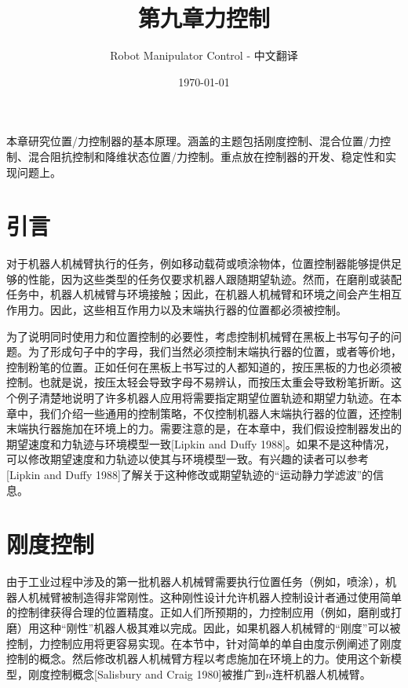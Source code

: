 \documentclass[12pt,a4paper]{ctexart}
\title{第九章\quad 力控制}
\author{Robot Manipulator Control - 中文翻译}
\date{\today}
\begin{document}
\maketitle

本章研究位置/力控制器的基本原理。涵盖的主题包括刚度控制、混合位置/力控制、混合阻抗控制和降维状态位置/力控制。重点放在控制器的开发、稳定性和实现问题上。

\section{引言}\label{sec:9.1}

对于机器人机械臂执行的任务，例如移动载荷或喷涂物体，位置控制器能够提供足够的性能，因为这些类型的任务仅要求机器人跟随期望轨迹。然而，在磨削或装配任务中，机器人机械臂与环境接触；因此，在机器人机械臂和环境之间会产生相互作用力。因此，这些相互作用力以及末端执行器的位置都必须被控制。

为了说明同时使用力和位置控制的必要性，考虑控制机械臂在黑板上书写句子的问题。为了形成句子中的字母，我们当然必须控制末端执行器的位置，或者等价地，控制粉笔的位置。正如任何在黑板上书写过的人都知道的，按压黑板的力也必须被控制。也就是说，按压太轻会导致字母不易辨认，而按压太重会导致粉笔折断。这个例子清楚地说明了许多机器人应用将需要指定期望位置轨迹和期望力轨迹。在本章中，我们介绍一些通用的控制策略，不仅控制机器人末端执行器的位置，还控制末端执行器施加在环境上的力。需要注意的是，在本章中，我们假设控制器发出的期望速度和力轨迹与环境模型一致[Lipkin and Duffy 1988]。如果不是这种情况，可以修改期望速度和力轨迹以使其与环境模型一致。有兴趣的读者可以参考[Lipkin and Duffy 1988]了解关于这种修改或期望轨迹的``运动静力学滤波''的信息。

\section{刚度控制}\label{sec:9.2}

由于工业过程中涉及的第一批机器人机械臂需要执行位置任务（例如，喷涂），机器人机械臂被制造得非常刚性。这种刚性设计允许机器人控制设计者通过使用简单的控制律获得合理的位置精度。正如人们所预期的，力控制应用（例如，磨削或打磨）用这种``刚性''机器人极其难以完成。因此，如果机器人机械臂的``刚度''可以被控制，力控制应用将更容易实现。在本节中，针对简单的单自由度示例阐述了刚度控制的概念。然后修改机器人机械臂方程以考虑施加在环境上的力。使用这个新模型，刚度控制概念[Salisbury and Craig 1980]被推广到$n$连杆机器人机械臂。
\end{document}
